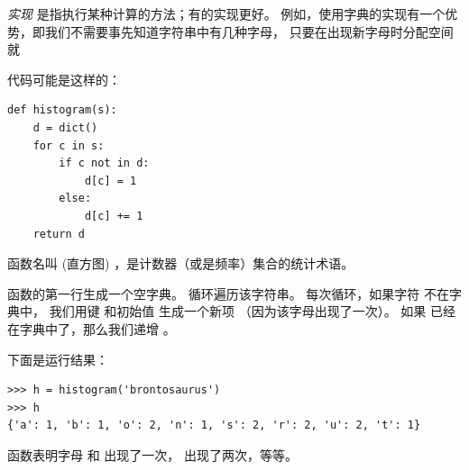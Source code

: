 {\em 实现} 是指执行某种计算的方法；有的实现更好。
例如，使用字典的实现有一个优势，即我们不需要事先知道字符串中有几种字母，
只要在出现新字母时分配空间就


代码可能是这样的：

\begin{lstlisting}
def histogram(s):
    d = dict()
    for c in s:
        if c not in d:
            d[c] = 1
        else:
            d[c] += 1
    return d
\end{lstlisting}

%

函数名叫  (直方图) ，是计数器（或是频率）集合的统计术语。

  


函数的第一行生成一个空字典。  循环遍历该字符串。
每次循环，如果字符  不在字典中， 我们用键  和初始值  生成一个新项 （因为该字母出现了一次）。 如果  已经在字典中了，那么我们递增  。



下面是运行结果：

\begin{lstlisting}
>>> h = histogram('brontosaurus')
>>> h
{'a': 1, 'b': 1, 'o': 2, 'n': 1, 's': 2, 'r': 2, 'u': 2, 't': 1}
\end{lstlisting}

%

 函数表明字母  和  出现了一次，   出现了两次，等等。

  


